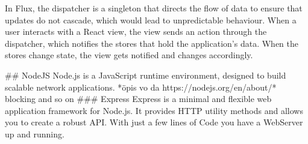 \begin{markdown}

In Flux, the dispatcher is a singleton that directs the flow of data to ensure that updates do not cascade, which would lead to unpredictable behaviour. When a user interacts with a React view, the view sends an action through the dispatcher, which notifies the stores that hold the application’s data. When the stores change state, the view gets notified and changes accordingly.

## NodeJS
Node.js is a JavaScript runtime environment, designed to build scalable network applications\cite{Node}.
*öpis vo da https://nodejs.org/en/about/* blocking and so on
### Express
Express\cite{Express} is a minimal and flexible web application framework for Node.js. It provides HTTP utility methods and allows you to create a robust API.
With just a few lines of Code you have a WebServer up and running.




\end{markdown}
